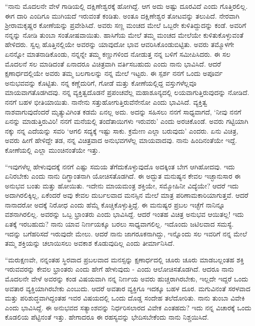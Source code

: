“ನಾನು ಮೊದಲನೇ ವೇಳೆ ಗಾಡಿಯಲ್ಲಿ ದಕ್ಷಿಣೇಶ್ವರಕ್ಕೆ ಹೋಗಿದ್ದೆ. ಆಗ ಅದು ಅಷ್ಟು ದೂರವಿದೆ ಎಂದು ಗೊತ್ತಿರಲಿಲ್ಲ. ಈಗ ದಾರಿ ಎಂದಿಗೂ ಮುಗಿಯದೆ ಇರುವಂತೆ ಕಂಡಿತು. ಅಂತೂ ದಕ್ಷಿಣೇಶ್ವರ ತೋಟವನ್ನು ತಲುಪಿದೆ. ನೇರವಾಗಿ ಶ‍್ರೀರಾಮಕೃಷ್ಣರ ಕೋಣೆಯನ್ನು ಪ್ರವೇಶಿಸಿದೆ. ಅವರು ಸಣ್ಣ ಮಂಚದ ಮೇಲೆ ಒಬ್ಬರೇ ಕುಳಿತಿದ್ದುದನ್ನು ಕಂಡೆ. ಅವರಿಗೆ ನನ್ನನ್ನು ನೋಡಿ ತುಂಬಾ ಸಂತೋಷವಾಯಿತು. ಹಾಸಿಗೆಯ ಮೇಲೆ ತಮ್ಮ ಮಂಚದ ಮೇಲೆಯೇ ಕುಳಿತುಕೊಳ್ಳುವಂತೆ ಹೇಳಿದರು. ಸ್ವಲ್ಪ ಹೊತ್ತಿನಲ್ಲಿಯೇ ಅವರನ್ನು ಯಾವುದೋ ಭಾವ ಆವರಿಸಿಕೊಂಡುಬಿಟ್ಟಿತು. ಅವರು ತಮ್ಮೊಳಗೇ ಏನನ್ನೋ ಮಾತನಾಡಿಕೊಂಡು, ನನ್ನನ್ನೇ ತಮ್ಮ ಕಣ್ಣುಗಳಿಂದ ನೋಡುತ್ತ ನನ್ನ ಬಳಿಗೆ ಸಮೀಪಿಸಿದರು. ಈ ಸಲ ಮೊದಲನೆ ಸಲ ಮಾಡಿದಂತೆ ಏನಾದರೂ ವಿಚಿತ್ರವಾಗಿ ವರ್ತಿಸಬಹುದು ಎಂದು ನಾನು ಭಾವಿಸಿದೆ. ಆದರೆ ಕ್ಷಣಾರ್ಧದಲ್ಲಿಯೇ ಅವರು ತಮ್ಮ ಬಲಗಾಲನ್ನು ನನ್ನ ಮೇಲೆ ಇಟ್ಟರು. ಈ ಸ್ಪರ್ಶ ನನಗೆ ಒಂದು ಅಪೂರ್ವ ಅನುಭವವನ್ನು ಕೊಟ್ಟಿತು. ನನ್ನ ಕಣ್ಣೆದುರಿಗೆ, ಗೋಡೆ ಮತ್ತು ಕೋಣೆಯಲ್ಲಿದ್ದ ವಸ್ತುಗಳೆಲ್ಲವೂ ಮಾಯವಾಗತೊಡಗಿದವು. ನನ್ನ ವ್ಯಕ್ತಿತ್ವದೊಡನೆ ಪ್ರಪಂಚವೆಲ್ಲ ಮಹಾಶೂನ್ಯದಲ್ಲಿ ಲಯವಾಗುತ್ತಿರುವುದನ್ನು ನೋಡಿದೆ. ನನಗೆ ಬಹಳ ಭೀತಿಯಾಯಿತು. ನಾನೇನು ಸತ್ತುಹೋಗುತ್ತಿರುವೆನೇನೋ ಎಂದು ಭಾವಿಸಿದೆ. ವ್ಯಕ್ತಿತ್ವ ನಾಶವಾಗುವುದೆಂದರೆ ಮೃತ್ಯುವಿಗಿಂತ ಕಡಮೆ ಏನಲ್ಲ ಅದು. ಅದನ್ನು ಸಹಿಸಲು ನನಗೆ ಸಾಧ್ಯವಾಗದೆ, ‘ನೀವು ನನಗೆ ಏನನ್ನು ಮಾಡುತ್ತಿರುವಿರಿ! ನನಗೆ ಮನೆಯಲ್ಲಿ ತಂದೆತಾಯಿಗಳು ಇರುವರು’ ಎಂದು ಅರಚಿಕೊಂಡೆ. ಅವರು ಗಟ್ಟಿಯಾಗಿ ನಕ್ಕು ನನ್ನ ಎದೆಯನ್ನು ಸವರಿ ‘ಆಗಲಿ ಸದ್ಯಕ್ಕೆ ಇಷ್ಟು ಸಾಕು. ಕ್ರಮೇಣ ಎಲ್ಲಾ ಬರುವುದು’ ಎಂದರು. ಏನು ವಿಚಿತ್ರ, ಅವರು ಹೀಗೆ ಹೇಳಿದ್ದೇ ತಡ, ನನ್ನ ವಿಚಿತ್ರವಾದ ಅನುಭವಗಳೆಲ್ಲ ಮಾಯವಾದವು. ನಾನು ಹಿಂದಿನಂತೆಯೇ ಇದ್ದೆ. ಕೋಣೆಯಲ್ಲಿ ಎಲ್ಲಾ ಮುಂಚಿನಂತೆಯೇ ಇತ್ತು.

“ಇವುಗಳೆಲ್ಲ ಹೇಳುವುದಕ್ಕೆ ನನಗೆ ಎಷ್ಟು ಸಮಯ ತೆಗೆದುಕೊಳ್ಳುವುದೊ ಅದಕ್ಕಿಂತ ಬೇಗ ಆಗಿಹೋದವು. ಇದು ಏನಿರಬೇಕು ಎಂದು ನಾನು ದಿಗ್ಭ್ರಾಂತನಾಗಿ ಯೋಚಿಸತೊಡಗಿದೆ. ಈ ಅದ್ಭುತ ಮನುಷ್ಯನ ಕೇವಲ ಇಚ್ಛಾನುಸಾರ ಈ ಅನುಭವ ಬಂತು ಮತ್ತು ಹೋಯಿತು. ಇದೇನು ಮಾಯಮಂತ್ರ ಶಕ್ತಿಯೇ, ಸಮ್ಮೋಹಿನೀ ವಿದ್ಯೆಯೇ? ಆದರೆ ಇದು ಅದಾಗಿರಲಿಕ್ಕಿಲ್ಲ, ಏಕೆಂದರೆ ಅವು ಕೇವಲ ದುರ್ಬಲವಾದ ಮನಸ್ಸಿನ ಮೇಲೆ ಮಾತ್ರ ಪರಿಣಾಮಕಾರಿಯಾಗುತ್ತವೆ. ಆದರೆ ನಾನಾದರೋ ಅದಕ್ಕೆ ನಿರೋಧ ಎಂದು ಹೆಮ್ಮೆ ಕೊಚ್ಚಿಕೊಳ್ಳುತ್ತಿದ್ದೆ. ಈ ಮನುಷ್ಯರ ಪ್ರಬಲ ಇಚ್ಛೆಗೆ ನಾನಿನ್ನೂ ವಶನಾಗಿರಲಿಲ್ಲ. ಅವರನ್ನು ಒಬ್ಬ ಭ್ರಾಂತರು ಎಂದು ಭಾವಿಸಿದ್ದೆ. ಆದರೆ ಇಂತಹ ವಿಚಿತ್ರ ಅನುಭವ ಆಯಿತಲ್ಲ! ಇದು ಏತಕ್ಕೆ ಇರಬಹುದು? ನಾನು ಯಾವ ನಿರ್ಣಯಕ್ಕೂ ಬರಲು ಸಾಧ್ಯವಾಗಲಿಲ್ಲ. ಇದೊಂದು ಜಟಿಲವಾದ ಸಮಸ್ಯೆ. ಇದನ್ನು ಬಗೆಹರಿಸದೆ ಇರುವುದೇ ಮೇಲು. ಆದರೆ ನಾನು ಜಾಗರೂಕನಾಗಿದ್ದು, ಇನ್ನೊಂದು ಸಲ ಇವರಿಗೆ ನನ್ನ ಮೇಲೆ ತಮ್ಮ ಶಕ್ತಿಯನ್ನು ಚಲಾಯಿಸಲು ಅವಕಾಶ ಕೊಡುವುದಿಲ್ಲ ಎಂದು ತೀರ್ಮಾನಿಸಿದೆ.

“ಮರುಕ್ಷಣವೇ, ನನ್ನಂತಹ ಸ್ಥಿರವಾದ ಪ್ರಬಲವಾದ ಮನಸ್ಸನ್ನು ಕ್ಷಣಾರ್ಧದಲ್ಲಿ ಚೂರು ಚೂರು ಮಾಡಬಲ್ಲಂತಹ ಶಕ್ತಿ ಇರುವವರನ್ನು ಕೇವಲ ಭ್ರಾಂತರು ಎಂದು ಹೇಗೆ ಹೇಳುವುದು - ಎಂದು ಆಲೋಚಿಸತೊಡಗಿದೆ. ಆದರೂ ನಾನು ಮೊದಲನೇ ವೇಳೆ ಅವರನ್ನು ಕಂಡ ವಿಷಯವಾಗಿ ನನ್ನ ನಿರ್ಣಯ ಅವರು ಹುಚ್ಚರಾಗಿರಬೇಕು, ಇಲ್ಲದೇ ಇದ್ದರೆ ಒಂದು ಅವತಾರ ವ್ಯಕ್ತಿಯಾಗಿರಬೇಕು ಎಂಬುದು. ಆದರೆ ಅವತಾರ ವ್ಯಕ್ತಿಗೂ ಇದಕ್ಕೂ ಬಹಳ ದೂರ. ಮಗುವಿನಂತೆ ಸರಳವಾದ ಮತ್ತು ಪರಿಶುದ್ಧವಾಗಿದ್ದಂತಹ ಇವರ ವಿಷಯದಲ್ಲಿ ಒಂದು ದೊಡ್ಡ ಸಂದೇಹ ತಲೆದೋರಿತು. ನಾನು ತುಂಬಾ ವಿವೇಕಿ ಎಂದು ಭಾವಿಸಿದ್ದೆ. ಈ ಅನುಭವದ ಸತ್ಯಾಂಶವನ್ನು ನಿರ್ಧರಿಸಲಾರದ ವಿವೇಕ ಎಂತಹದು? ಇದು ನನ್ನ ವಿಚಾರಕ್ಕೆ ಒಂದು ಕೊಡಲಿಯ ಪೆಟ್ಟಿನಂತೆ ಇತ್ತು. ಹೇಗಾದರೂ ಈ ರಹಸ್ಯವನ್ನು ಭೇದಿಸಬೇಕೆಂದು ನಾನು ನಿಶ್ಚಯಿಸಿದೆ.

